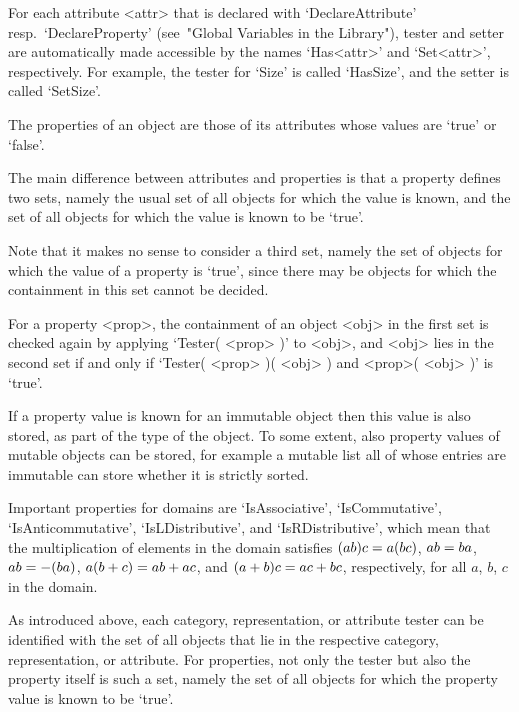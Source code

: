 For each attribute <attr> that is declared with `DeclareAttribute'
resp.~`DeclareProperty' (see~"Global Variables in the Library"),
tester and setter are automatically made accessible by the names
`Has<attr>' and `Set<attr>', respectively.
For example, the tester for `Size' is called `HasSize',
and the setter is called `SetSize'.



The properties of an object are those of its attributes whose values are
`true' or `false'.

The main difference between attributes and properties is that a property
defines two sets,
namely the usual set of all objects for which the value is known,
and the set of all objects for which the value is known to be `true'.

Note that it makes no sense to consider a third set, namely the set of
objects for which the value of a property is `true', since there may be
objects for which the containment in this set cannot be decided.

For a property <prop>, the containment of an object <obj> in the first
set is checked again by applying `Tester( <prop> )' to <obj>,
and <obj> lies in the second set if and only if
`Tester( <prop> )( <obj> ) and <prop>( <obj> )' is `true'.

If a property value is known for an immutable object then this value is
also stored, as part of the type of the object.
To some extent, also property values of mutable objects can be stored,
for example a mutable list all of whose entries are immutable can store
whether it is strictly sorted.

Important properties for domains are `IsAssociative', `IsCommutative',
`IsAnticommutative', `IsLDistributive', and `IsRDistributive',
which mean that the multiplication of elements in the domain satisfies
$(a \* b ) \* c = a \* ( b \* c )$, $a \* b = b \* a$,
$a \* b = - ( b \* a )$, $a \* ( b + c ) = a \* b + a \* c$,
and $( a + b ) \* c = a \* c + b \* c$, respectively,
for all $a$, $b$, $c$ in the domain.



As introduced above, each category, representation, or attribute tester
can be identified with the set of all objects that lie in the respective
category, representation, or attribute.
For properties, not only the tester but also the property itself is such
a set,
namely the set of all objects for which the property value is known to be
`true'.

